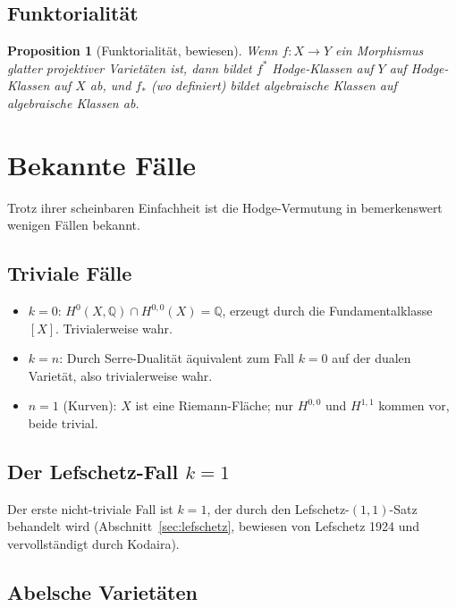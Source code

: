 \documentclass[12pt,a4paper]{amsart}
\newtheorem{proposition}[theorem]{Proposition}
\theoremstyle{definition}
\theoremstyle{remark}
\begin{document}
\subsection{Funktorialität}

\begin{proposition}[Funktorialität, bewiesen]
Wenn $f: X \to Y$ ein Morphismus glatter projektiver Varietäten ist, dann bildet
$f^*$ Hodge-Klassen auf $Y$ auf Hodge-Klassen auf $X$ ab, und $f_*$ (wo definiert)
bildet algebraische Klassen auf algebraische Klassen ab.
\end{proposition}

\section{Bekannte Fälle}
\label{sec:bekannt}

Trotz ihrer scheinbaren Einfachheit ist die Hodge-Vermutung in bemerkenswert wenigen
Fällen bekannt.

\subsection{Triviale Fälle}

\begin{itemize}
\item $k = 0$: $H^0(X,\mathbb{Q}) \cap H^{0,0}(X) = \mathbb{Q}$, erzeugt durch
  die Fundamentalklasse $[X]$. Trivialerweise wahr.
\item $k = n$: Durch Serre-Dualität äquivalent zum Fall $k = 0$ auf der dualen
  Varietät, also trivialerweise wahr.
\item $n = 1$ (Kurven): $X$ ist eine Riemann-Fläche; nur $H^{0,0}$ und $H^{1,1}$
  kommen vor, beide trivial.
\end{itemize}

\subsection{Der Lefschetz-Fall $k=1$}

Der erste nicht-triviale Fall ist $k = 1$, der durch den Lefschetz-$(1,1)$-Satz
behandelt wird (Abschnitt~\ref{sec:lefschetz}, bewiesen von Lefschetz 1924 und
vervollständigt durch Kodaira).

\subsection{Abelsche Varietäten}
\end{document}
